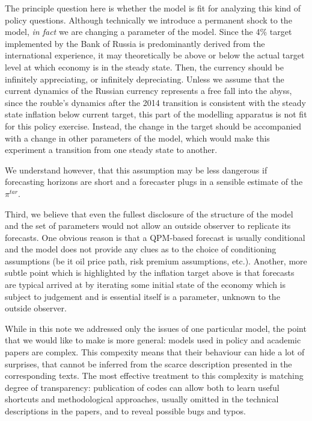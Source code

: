 \documentclass[12pt]{article}
\begin{document}
The principle question here is whether the model is fit for analyzing this kind of policy questions. Although technically we introduce a permanent shock to the model, {\it in fact} we are changing a parameter of the model. Since the 4\% target implemented by the Bank of Russia is predominantly derived from the international experience, it may theoretically be above or below the actual target level at which economy is in the steady state. Then, the currency should be infinitely appreciating, or infinitely depreciating. Unless we assume that the current dynamics of the Russian currency represents a free fall into the abyss, since the rouble's dynamics after the 2014 transition is consistent with the steady state inflation below current target, this part of the modelling apparatus is not fit for this policy exercise. Instead, the change in the target should be accompanied with a change in other parameters of the model, which would make this experiment a transition from one steady state to another. 

We understand however, that this assumption may be less dangerous if forecasting horizons are short and a forecaster plugs in a sensible estimate of the $\pi^{tar}$.

Third, we believe that even the fullest disclosure of the structure of the model and the set of parameters would not allow an outside observer to replicate its forecasts. One obvious reason is that a QPM-based forecast is usually conditional and the model does not provide any clues as to the choice of conditioning assumptions (be it oil price path, risk premium assumptions,  etc.). Another, more subtle point which is highlighted by the inflation target above is that forecasts are typical arrived at by iterating some initial state of the economy which is subject to judgement and is essential itself is a parameter, unknown to the outside observer. 

While in this note we addressed only the issues of one particular model, the point that we would like to make is more general: models used in policy and academic papers are complex. This compexity means that their behaviour can hide a lot of surprises, that cannot be inferred from the scarce description presented in the corresponding texts. The most effective treatment to this complexity is matching degree of transparency: publication of codes can allow both to learn useful shortcuts and methodological approaches, usually omitted in the technical descriptions in the papers, and to reveal possible bugs and typos. 
\end{document}
